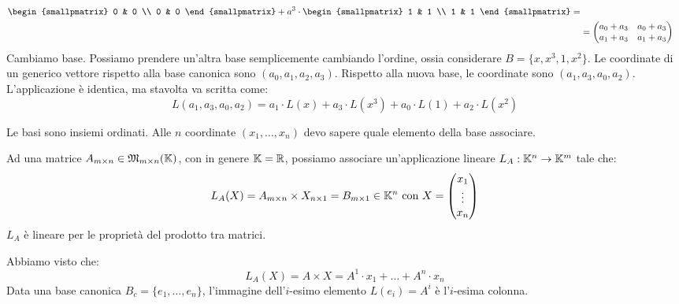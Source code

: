 \begin{exmp}
\begin{align*}
\begin{smallpmatrix}
0 & 0 \\ 0 & 0
\end{smallpmatrix} 
+ a^3 \cdot 
\begin{smallpmatrix}
1 & 1 \\ 1 & 1
\end{smallpmatrix} = \\
&=
\begin{pmatrix}
a_0+a_3 & a_0+a_3 \\
a_1+a_3 & a_1+a_3
\end{pmatrix}
\end{align*}
Cambiamo base. Possiamo prendere un'altra base semplicemente cambiando l'ordine, ossia considerare $B = \{ x, x^3, 1, x^2 \}$. Le coordinate di un generico vettore rispetto alla base canonica sono $(a_0, a_1, a_2, a_3)$. Rispetto alla nuova base, le coordinate sono $(a_1, a_3, a_0, a_2)$. L'applicazione \`e identica, ma stavolta va scritta come:
\[
L(a_1, a_3, a_0, a_2) = a_1 \cdot L(x) + a_3 \cdot L(x^3) + a_0 \cdot L(1) + a_2 \cdot L(x^2)
\]
\end{exmp}
Le basi sono insiemi ordinati. Alle $n$ coordinate $(x_{1}, \ldots, x_{n})$ devo sapere quale elemento della base associare.

Ad una matrice $A_{m \times n} \in \mathfrak{M}_{m \times n} ( \mathbb{K} )$, con in genere $\mathbb{K} = \mathbb{R}$, possiamo associare un'applicazione lineare $L_A : \mathbb{K}^n \to \mathbb{K}^m$ tale che:
\[
L_A(X) = A_{m \times n} \times X_{n \times 1} = B_{m \times 1} \in \mathbb{K}^n \text{ con } X = 
\begin{pmatrix}
x_1 \\ \vdots \\ x_n
\end{pmatrix}
\]
$L_A$ \`e lineare per le propriet\`a del prodotto tra matrici.

Abbiamo visto che:
\[
L_A(X) = A \times X = A^1 \cdot x_1 + \ldots + A^n \cdot x_n
\]
Data una base canonica $B_c = \{ e_1, \ldots, e_n \}$, l'immagine dell'$i$-esimo elemento $L(e_i) = A^i$ \`e l'$i$-esima colonna.

